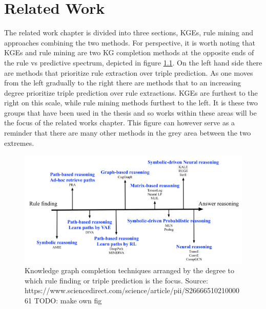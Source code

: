 \chapter{Related Work}
\label{related_work}
The related work chapter is divided into three sections, KGEs, rule mining and approaches combining the two methods. For perspective, it is worth noting that KGEs and rule mining are two KG completion methods at the opposite ends of the rule vs predictive spectrum, depicted in figure \ref{scale}. On the left hand side there are methods that prioritize rule extraction over triple prediction. As one moves from the left gradually to the right there are methods that to an increasing degree prioritize triple prediction over rule extractions. KGEs are furthest to the right on this scale, while rule mining methods furthest to the left. It is these two groups that have been used in the thesis and so works within these areas will be the focus of the related works chapter. This figure can however serve as a reminder that there are many other methods in the grey area between the two extremes. 

\begin{figure}[htbp]
\centering
\includegraphics[width=1\linewidth]{figures/related_works/Screenshot.png}
\caption{Knowledge graph completion techniques arranged by the degree to which rule finding or triple prediction is the focus. Source:  https://www.sciencedirect.com/science/article/pii/S2666651021000061   TODO: make own fig}
\label{scale}
\end{figure}

